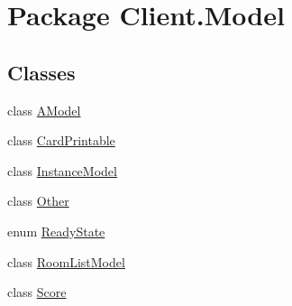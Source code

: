 \hypertarget{namespaceClient_1_1Model}{}\section{Package Client.\+Model}
\label{namespaceClient_1_1Model}
\subsection*{Classes}
\begin{DoxyCompactItemize}
\item 
class \mbox{\hyperlink{classClient_1_1Model_1_1AModel}{A\+Model}}
\item 
class \mbox{\hyperlink{classClient_1_1Model_1_1CardPrintable}{Card\+Printable}}
\item 
class \mbox{\hyperlink{classClient_1_1Model_1_1InstanceModel}{Instance\+Model}}
\item 
class \mbox{\hyperlink{classClient_1_1Model_1_1Other}{Other}}
\item 
enum \mbox{\hyperlink{enumClient_1_1Model_1_1ReadyState}{Ready\+State}}
\item 
class \mbox{\hyperlink{classClient_1_1Model_1_1RoomListModel}{Room\+List\+Model}}
\item 
class \mbox{\hyperlink{classClient_1_1Model_1_1Score}{Score}}
\end{DoxyCompactItemize}
